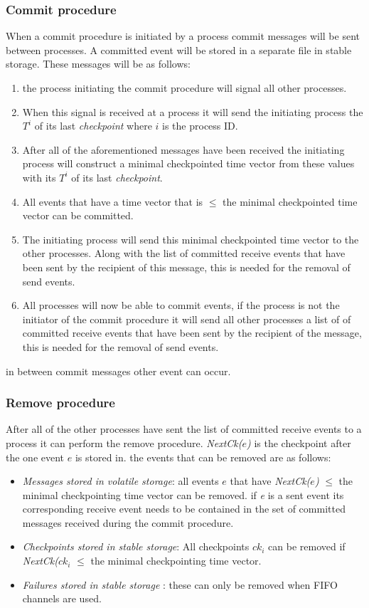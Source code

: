 \documentclass[twocolumn, a4paper,11pt]{article}%
\begin{document}
\subsubsection{Commit procedure}
When a commit procedure is initiated by a process commit messages will be sent between processes. A committed event will be stored in a separate file in stable storage. These messages will be as follows:
\begin{enumerate}
	\item the process initiating the commit procedure will signal all other processes.
	\item When this signal is received at a process it will send the initiating process the \(T^{i}\)  of its last \textit{checkpoint} where \(i\) is the process ID.
	\item After all of the aforementioned messages have been received the initiating process will construct a minimal checkpointed time vector from these values with its \(T^{i}\)  of its last \textit{checkpoint}.
	\item All events that have a time vector that is \(\leq\) the minimal checkpointed time vector can be committed.
	\item  The initiating process will send this minimal checkpointed time vector to the other processes. Along with the list of committed receive events that have been sent by the recipient of this message, this is needed for the removal of send events.
	\item All processes will now be able to commit events, if the process is not the initiator of the commit procedure it will send all other processes a list of of committed receive events that have been sent by the recipient of the message, this is needed for the removal of send events.	
\end{enumerate}
in between commit messages other event can occur.

\subsubsection{Remove procedure}
\par After all of the other processes have sent the list of committed receive events to a process it can perform the remove procedure. \textit{NextCk(\(e\))} is the checkpoint after the one event \textit{\(e\)} is stored in. the events that can be removed are as follows:
\begin{itemize}
	\item \textit{Messages stored in volatile storage}: all events \textit{\(e\)} that have \textit{NextCk(\(e\))} \(\leq\) the minimal checkpointing time vector  can be removed. if \textit{e} is a sent event its corresponding receive event needs to be contained in the set of committed messages received during the commit procedure.
	\item \textit{Checkpoints stored in stable storage}: All checkpoints \textit{\(ck_{i}\)} can be removed if \textit{NextCk(\(ck_{i}\)} \(\leq\) the minimal checkpointing time vector.
	\item \textit{Failures stored in stable storage }: these can only be removed when FIFO channels are used.
\end{itemize}
\end{document}

